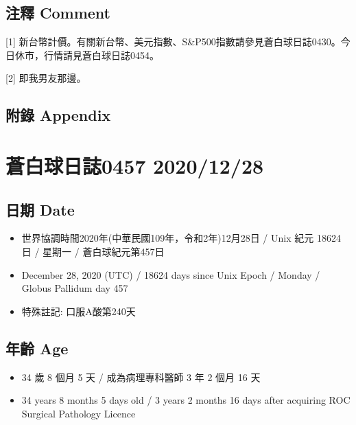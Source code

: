 \documentclass[a5paper, 10pt
]{book}
\providecommand{\tightlist}{%
  \setlength{\itemsep}{0pt}\setlength{\parskip}{0pt}}
\begin{document}
\hypertarget{ux6ce8ux91cb-comment-26}{%
\subsection{注釋 Comment}\label{ux6ce8ux91cb-comment-26}}

{[}1{]}
新台幣計價。有關新台幣、美元指數、S\&P500指數請參見蒼白球日誌0430。今日休市，行情請見蒼白球日誌0454。

{[}2{]} 即我男友那邊。

\hypertarget{ux9644ux9304-appendix-26}{%
\subsection{附錄 Appendix}\label{ux9644ux9304-appendix-26}}

\hypertarget{ux84bcux767dux7403ux65e5ux8a8c0457-20201228}{%
\section{蒼白球日誌0457
2020/12/28}\label{ux84bcux767dux7403ux65e5ux8a8c0457-20201228}}

\hypertarget{ux65e5ux671f-date-27}{%
\subsection{日期 Date}\label{ux65e5ux671f-date-27}}

\begin{itemize}
\tightlist
\item
  世界協調時間2020年(中華民國109年，令和2年)12月28日 / Unix 紀元 18624
  日 / 星期一 / 蒼白球紀元第457日
\item
  December 28, 2020 (UTC) / 18624 days since Unix Epoch / Monday /
  Globus Pallidum day 457
\item
  特殊註記: 口服A酸第240天
\end{itemize}

\hypertarget{ux5e74ux9f61-age-27}{%
\subsection{年齡 Age}\label{ux5e74ux9f61-age-27}}

\begin{itemize}
\tightlist
\item
  34 歲 8 個月 5 天 / 成為病理專科醫師 3 年 2 個月 16 天
\item
  34 years 8 months 5 days old / 3 years 2 months 16 days after
  acquiring ROC Surgical Pathology Licence
\end{itemize}
\end{document}
